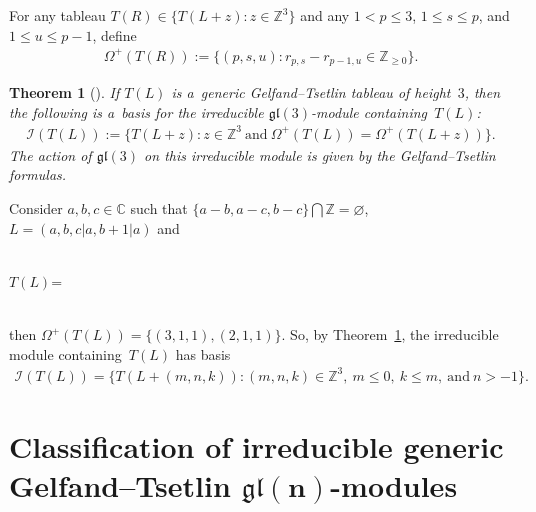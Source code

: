 \documentclass[pdftex]{sigma}
\numberwithin{equation}{section}
\newtheorem{Theorem}{Theorem}[section]
\def\Stone#1{\fbox{\makebox[10mm]{\strut#1}}\kern2pt}
\begin{document}
For any tableau $T(R)\in\{T(L+z):z\in \mathbb{Z}^{3}\}$ and any $1<p\leq 3$, $1\leq s\leq p$, and $1\leq u\leq p-1$, def\/ine
\begin{gather*}
\Omega^{+}(T(R)) :=\{(p,s,u):r_{p,s}-r_{p-1,u}\in\mathbb{Z}_{\geq 0}\}.
\end{gather*}

\begin{Theorem}[\cite{Ramirez}]
\label{Basis for irreducible generic modules gl(3)}
If $T(L)$ is a~generic Gelfand--Tsetlin tableau of height~$3$, then the following is a~basis for the irreducible
$\mathfrak{gl}(3)$-module containing~$T(L)$:
\begin{gather*}
\mathcal{I}(T(L)):=\big\{T(L+z):z\in\mathbb{Z}^{3}~\text{and}~\Omega^{+}(T(L))=\Omega^{+}(T(L+z))\big\}.
\end{gather*}
The action of $\mathfrak{gl}(3)$ on this irreducible module is given by the Gelfand--Tsetlin formulas.
\end{Theorem}

\begin{Example}
Consider $a,b,c\in\mathbb{C}$ such that $\{a-b,a-c,b-c\}\bigcap\mathbb{Z}=\varnothing$, $L=(a,b,c|a,b+1|a)$ and
\begin{center}
\hspace{1.5cm} \Stone{a}\Stone{b}\Stone{c}
\\[0.2pt] $T(L)$=\hspace{0.5cm} \Stone{a}\Stone{b+1}\hspace{1.2cm}
\\[0.2pt] \hspace{1.4cm} \Stone{a}
\\
\end{center}
then $\Omega^{+}(T(L))=\{(3,1,1), (2,1,1)\}$.
So, by Theorem~\ref{Basis for irreducible generic modules gl(3)}, the irreducible module con\-tai\-ning~$T(L)$ has basis
\begin{gather*}
\mathcal{I}(T(L))=\big\{T(L+(m,n,k)):(m,n,k)\in\mathbb{Z}^{3}, \ m\leq 0,\ k\leq m,~\text{and}~n>-1\big\}.
\end{gather*}
\end{Example}

\section[Classif\/ication of irreducible generic Gelfand--Tsetlin $\mathfrak{gl}(n)$-modules]{Classif\/ication of irreducible generic\\
Gelfand--Tsetlin $\boldsymbol{\mathfrak{gl}(n)}$-modules}
\label{section6}
\end{document}
